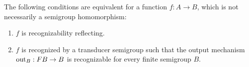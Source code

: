 \begin{theorem}\label{thm:reco-reflecting-functions}
     The following conditions are equivalent for a function $f : A \to B$, which is not necessarily a semigroup homomorphism:
    \begin{enumerate}
        \item \label{it:reco-refl} $f$ is recognizability reflecting.
        \item \label{it:trans-semig-reco}$f$ is recognized by a transducer semigroup  such that the output mechanism 
        $\outfun_B : \functor B \to B$
        is recognizable for every finite semigroup $B$.
    \end{enumerate}
\end{theorem}
